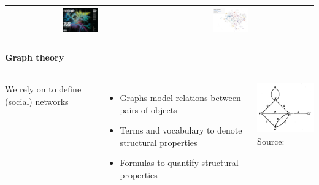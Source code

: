 \documentclass[8pt]{beamer}
\begin{document}
\begin{frame}
\begin{table}
\begin{tabular}{|C|C|C|}
\includegraphics[width=0.25\textwidth, height=0.25\textheight, keepaspectratio]{nature} &
\includegraphics[width=0.25\textwidth, height=0.25\textheight, keepaspectratio]{open_syllabus} \\
\midrule
\end{tabular}
\end{table}
\end{frame}


\begin{frame}
\frametitle{\insertsection}
\framesubtitle{Graph theory}


\begin{columns}[c]
We rely on {\color{blue}{graph theory}} to define (social) networks
    \begin{itemize}
    \item Graphs model relations between pairs of objects
    \item Terms and vocabulary to denote structural properties
    \item Formulas to quantify structural properties
    \end{itemize}

\centering
\includegraphics[width=4cm]{graph_theory}\\
\tiny{Source: \cite{Bondy1976}}
\end{columns}

\end{frame}

\end{document}
